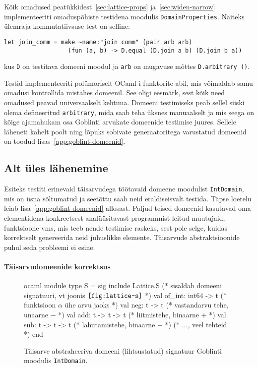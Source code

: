 \documentclass[../thesis.tex]{subfiles}
\begin{document}
Kõik omadused peatükkidest~\ref{sec:lattice-props} ja~\ref{sec:widen-narrow} implementeeriti omaduspõhiste testidena moodulis \texttt{DomainProperties}. Näiteks ülemraja kommutatiivsuse test on selline:
\begin{verbatim}
let join_comm = make ~name:"join comm" (pair arb arb)
                  (fun (a, b) -> D.equal (D.join a b) (D.join b a))
\end{verbatim}
kus \texttt{D} on testitava domeeni moodul ja \texttt{arb} on mugavuse mõttes \texttt{D.arbitrary ()}.

Testid implementeeriti polümorfselt OCaml-i funktorite abil, mis võimaldab samu omadusi kontrollida mistahes domeenil. See oligi eesmärk, sest kõik need omadused peavad universaalselt kehtima. Domeeni testimiseks peab sellel siiski olema defineeritud \texttt{arbitrary}, mida saab teha üksnes manuaalselt ja mis seega on kõige ajamahukam osa Goblinti arvukate domeenide testimise juures. Sellele läheneti kahelt poolt ning lõpuks sobivate generaatoritega varustatud domeenid on toodud lisas~\ref{app:goblint-domeenid}.

\subsection{Alt üles lähenemine}
Esiteks testiti erinevaid täisarvudega töötavaid domeene moodulist \texttt{IntDomain}, mis on üsna sõltumatud ja seetõttu saab neid eraldiseisvalt testida. Täpse loetelu leiab lisa~\ref{app:goblint-domeenid} allosast. Paljud teised domeenid kasutavad oma elementidena konkreetsest analüüsitavast programmist leitud muutujaid, funktsioone vms, mis teeb nende testimise raskeks, sest pole selge, kuidas korrektselt genereerida neid juhuslikke elemente. Täisarvude abstraktsioonide puhul seda probleemi ei esine.

\paragraph{Täisarvudomeenide korrektsus}
\begin{figure}
	\centering
	\begin{bminted}[mathescape]{ocaml}
		module type S =
		sig
		  include Lattice.S (* sisaldab domeeni signatuuri, vt joonis $\texttt{\ref{fig:lattice-s}}$ *)
		  val of_int: int64 -> t (* funktsioon $\alpha$ ühe arvu jaoks *)
		  val neg: t -> t (* vastandarvu tehe, unaarne $-$ *)
		  val add: t -> t -> t (* liitmistehe, binaarne $+$ *)
		  val sub: t -> t -> t (* lahutamistehe, binaarne $-$ *)
		  (* ..., veel tehteid *)
		end
	\end{bminted}
	\caption{Täisarve abstraheeriva domeeni (lihtsustatud) signatuur Goblinti moodulis \texttt{IntDomain}.}
	\label{fig:intdomain-s}
\end{figure}
\end{document}
